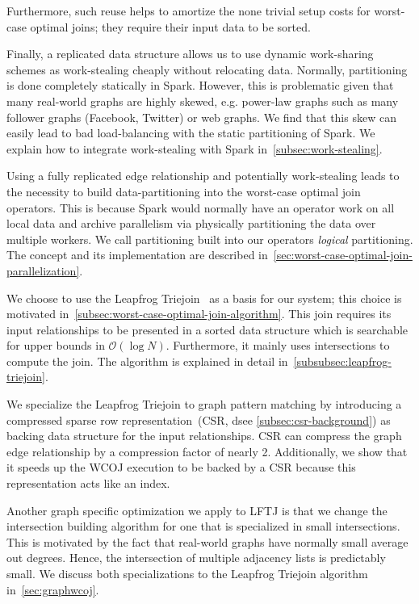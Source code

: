Furthermore, such reuse helps to amortize the none trivial setup costs for worst-case optimal joins;
they require their input data to be sorted.

Finally, a replicated data structure allows us to use dynamic work-sharing schemes as work-stealing cheaply without relocating
data.
Normally, partitioning is done completely statically in Spark.
However, this is problematic given that many real-world graphs are highly skewed, e.g. power-law graphs such as many follower graphs
(Facebook, Twitter) or web graphs.
We find that this skew can easily lead to bad load-balancing with the static partitioning of Spark.
We explain how to integrate work-stealing with Spark in~\cref{subsec:work-stealing}.

Using a fully replicated edge relationship and potentially work-stealing leads to the necessity to build data-partitioning into
the worst-case optimal join operators.
This is because Spark would normally have an operator work on all local data and archive parallelism via physically partitioning the
data over multiple workers.
We call partitioning built into our operators \textit{logical} partitioning.
The concept and its implementation are described in~\cref{sec:worst-case-optimal-join-parallelization}.

We choose to use the Leapfrog Triejoin~\cite{lftj} as a basis for our system;
this choice is motivated in~\cref{subsec:worst-case-optimal-join-algorithm}.
This join requires its input relationships to be presented in a sorted data structure which is searchable for upper bounds in
$\mathcal{O} (\log N)$.
Furthermore, it mainly uses intersections to compute the join.
The algorithm is explained in detail in~\cref{subsubsec:leapfrog-triejoin}.

We specialize the Leapfrog Triejoin to graph pattern matching by introducing a compressed sparse row representation~(\textsc{CSR}, dsee
\cref{subsec:csr-background}) as backing data structure for the input relationships.
\textsc{CSR} can compress the graph edge relationship by a compression factor of nearly 2.
Additionally, we show that it speeds up the \textsc{WCOJ} execution to be backed by a \textsc{CSR} because this representation
acts like an index.

Another graph specific optimization we apply to \textsc{LFTJ} is that we change the intersection building algorithm for one
that is specialized in small intersections.
This is motivated by the fact that real-world graphs have normally small average out degrees.
Hence, the intersection of multiple adjacency lists is predictably small.
We discuss both specializations to the Leapfrog Triejoin algorithm in~\cref{sec:graphwcoj}.

